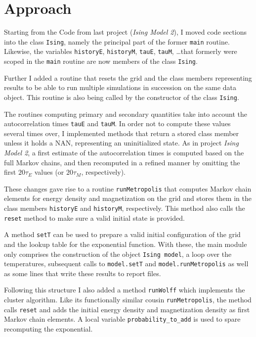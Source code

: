 \chapter{Approach}
Starting from the Code from last project (\emph{Ising Model 2}), I moved code sections into the class \texttt{Ising}, namely the principal part of the former \texttt{main} routine. Likewise, the variables \texttt{historyE}, \texttt{historyM}, \texttt{tauE}, \texttt{tauM}, \ldots that formerly were scoped in the \texttt{main} routine are now members of the class \texttt{Ising}.

Further I added a routine that resets the grid and the class members representing results to be able to run multiple simulations in succession on the same data object. This routine is also being called by the constructor of the class \texttt{Ising}.

The routines computing primary and secondary quantities take into account the autocorrelation times \texttt{tauE} and \texttt{tauM}. In order not to compute these values several times over, I implemented methods that return a stored class member unless it holds a NAN, representing an uninitialized state. As in  project \emph{Ising Model 2}, a first estimate of the autocorrelation times is computed based on the full Markov chains, and then recomputed in a refined manner by omitting the first $20 \tau_E$ values (or $20 \tau_M$, respectively).

These changes gave rise to a routine \texttt{runMetropolis} that computes Markov chain elements for energy density and magnetization on the grid and stores them in the class members \texttt{historyE} and \texttt{historyM}, respectively. This method also calls the \texttt{reset} method to make sure a valid initial state is provided. 

A method \texttt{setT} can be used to prepare a valid initial configuration of the grid and the lookup table for the exponential function. With these, the main module only comprises the construction of the object \texttt{Ising model}, a loop over the temperatures, subsequent calls to \texttt{model.setT} and \texttt{model.runMetropolis} as well as some lines that write these results to report files.

Following this structure I also added a method \texttt{runWolff} which implements the cluster algorithm. Like its functionally similar cousin \texttt{runMetropolis}, the method calls \texttt{reset} and adds the initial energy density and magnetization density as first Markov chain elements. A local variable \texttt{probability\_to\_add} is used to spare recomputing the exponential.

